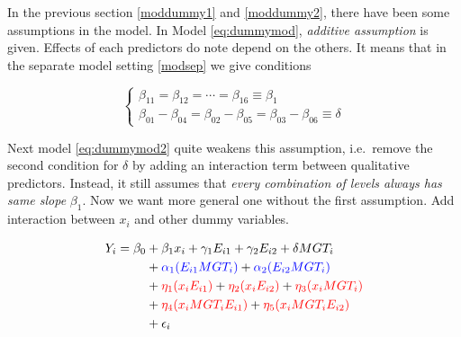 \documentclass[]{book}
\newenvironment{Shaded}{\begin{snugshade}}{\end{snugshade}}
\newcommand{\CommentTok}[1]{\textcolor[rgb]{0.56,0.35,0.01}{\textit{#1}}}
\newcommand{\DataTypeTok}[1]{\textcolor[rgb]{0.13,0.29,0.53}{#1}}
\newcommand{\KeywordTok}[1]{\textcolor[rgb]{0.13,0.29,0.53}{\textbf{#1}}}
\newcommand{\NormalTok}[1]{#1}
\newcommand{\OperatorTok}[1]{\textcolor[rgb]{0.81,0.36,0.00}{\textbf{#1}}}
\newcommand{\StringTok}[1]{\textcolor[rgb]{0.31,0.60,0.02}{#1}}
\theoremstyle{definition}
\theoremstyle{definition}
\theoremstyle{definition}
\theoremstyle{remark}
\begin{document}
In the previous section \ref{moddummy1} and \ref{moddummy2}, there have been some assumptions in the model. In Model \eqref{eq:dummymod}, \emph{additive assumption} is given. Effects of each predictors do note depend on the others. It means that in the separate model setting \ref{modsep} we give conditions

\[
\begin{cases}
  \beta_{11} = \beta_{12} = \cdots = \beta_{16} \equiv \beta_1 \\
  \beta_{01} - \beta_{04} = \beta_{02} - \beta_{05} = \beta_{03} - \beta_{06} \equiv \delta
\end{cases}
\]

Next model \eqref{eq:dummymod2} quite weakens this assumption, i.e.~remove the second condition for \(\delta\) by adding an interaction term between qualitative predictors. Instead, it still assumes that \emph{every combination of levels always has same slope} \(\beta_1\). Now we want more general one without the first assumption. Add interaction between \(x_i\) and other dummy variables.

\begin{equation}
  \begin{split}
    Y_i = \beta_0 & + \beta_1 x_i + \gamma_1 E_{i1} + \gamma_2 E_{i2} + \delta MGT_i \\
    & + {\color{blue}{\alpha_1 (E_{i1} MGT_i)}} + {\color{blue}{\alpha_2 (E_{i2} MGT_i)}} \\
    & + {\color{red}{\eta_1(x_i E_{i1})}} + {\color{red}{\eta_2(x_i E_{i2})}} + {\color{red}{\eta_3(x_i MGT_i)}} \\
    & + {\color{red}{\eta_4(x_i MGT_i E_{i1})}} + {\color{red}{\eta_5(x_i MGT_i E_{i2})}} \\
    & + \epsilon_i
  \end{split}
  \label{eq:dummymod3}
\end{equation}

\begin{Shaded}
\end{Shaded}
\end{document}
